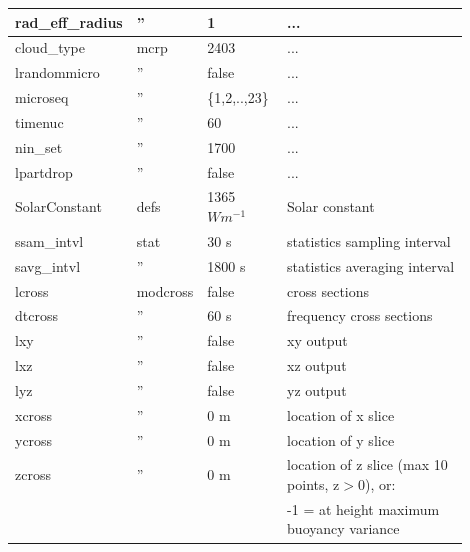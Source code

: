 \documentclass[11pt,a4paper]{article}
\begin{document}
\begin{longtable}[htb]{p{0.12\linewidth}p{0.1\linewidth}p{0.18\linewidth}p{0.5\linewidth}}
rad\_eff\_radius & '' & 1                 & ...                                                   \\
\hline
cloud\_type  & mcrp & 2403                & ...                                                   \\
lrandommicro &  ''  & false               & ...                                                   \\
microseq     &  ''  & \{1,2,..,23\}       & ...                                                   \\
timenuc      &  ''  & 60                  & ...                                                   \\
nin\_set     &  ''  & 1700                & ...                                                   \\
lpartdrop    &  ''  & false               & ...                                                   \\
\hline
SolarConstant& defs & 1365 $Wm^{-1}$      & Solar constant                                        \\ 
\hline
ssam\_intvl  & stat & 30 s                & statistics sampling interval                          \\
savg\_intvl  &  ''  & 1800 s              & statistics averaging interval                         \\
\hline
lcross       & modcross & false              & cross sections                                     \\
dtcross      &  ''  & 60 s                & frequency cross sections                              \\
lxy          &  ''  & false               & xy output                                             \\
lxz          &  ''  & false               & xz output                                             \\
lyz          &  ''  & false               & yz output                                             \\
xcross       &  ''  & 0 m                 & location of x slice                                   \\
ycross       &  ''  & 0 m                 & location of y slice                                   \\
zcross       &  ''  & 0 m                 & location of z slice (max 10 points, z$>$0), or:       \\
             &      &                     & \hspace{2mm} -1 = at height maximum buoyancy variance \\

\end{longtable}
\end{document}
